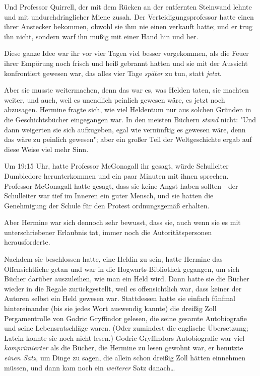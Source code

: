 {Und Professor Quirrell, der mit dem Rücken an der entfernten Steinwand lehnte und mit undurchdringlicher Miene zusah. Der Verteidigungsprofessor hatte einen ihrer Anstecker bekommen, obwohl sie ihm nie einen verkauft hatte; und er trug ihn nicht, sondern warf ihn müßig mit einer Hand hin und her.

Diese ganze Idee war ihr vor vier Tagen viel besser vorgekommen, als die Feuer ihrer Empörung noch frisch und heiß gebrannt hatten und sie mit der Aussicht konfrontiert gewesen war, das alles vier Tage \emph{später} zu tun, statt \emph{jetzt}.

Aber sie musste weitermachen, denn das war es, was Helden taten, sie machten weiter, und auch, weil es unendlich peinlich gewesen wäre, es jetzt noch abzusagen. Hermine fragte sich, wie viel Heldentum nur aus solchen Gründen in die Geschichtsbücher eingegangen war. In den meisten Büchern \emph{stand} nicht: "Und dann weigerten sie sich aufzugeben, egal wie vernünftig es gewesen wäre, denn das wäre zu peinlich gewesen"; aber ein großer Teil der Weltgeschichte ergab auf diese Weise viel mehr Sinn.

Um 19:15 Uhr, hatte Professor McGonagall ihr gesagt, würde Schulleiter Dumbledore herunterkommen und ein paar Minuten mit ihnen sprechen. Professor McGonagall hatte gesagt, dass sie keine Angst haben sollten - der Schulleiter war tief im Inneren ein guter Mensch, und sie hatten die Genehmigung der Schule für den Protest ordnungsgemäß erhalten.

Aber Hermine war sich dennoch sehr bewusst, dass sie, auch wenn sie es mit unterschriebener Erlaubnis tat, immer noch die Autoritätspersonen herausforderte.

Nachdem sie beschlossen hatte, eine Heldin zu sein, hatte Hermine das Offensichtliche getan und war in die Hogwarts-Bibliothek gegangen, um sich Bücher darüber auszuleihen, wie man ein Held wird. Dann hatte sie die Bücher wieder in die Regale zurückgestellt, weil es offensichtlich war, dass keiner der Autoren selbst ein Held gewesen war. Stattdessen hatte sie einfach fünfmal hintereinander (bis sie jedes Wort auswendig kannte) die dreißig Zoll Pergamentrolle von Godric Gryffindor gelesen, die seine gesamte Autobiografie und seine Lebensratschläge waren. (Oder zumindest die englische Übersetzung; Latein konnte sie noch nicht lesen.) Godric Gryffindors Autobiografie war viel \emph{komprimierter} als die Bücher, die Hermine zu lesen gewohnt war, er benutzte \emph{einen Satz}, um Dinge zu sagen, die allein schon dreißig Zoll hätten einnehmen müssen, und dann kam noch ein \emph{weiterer} Satz danach…

}
